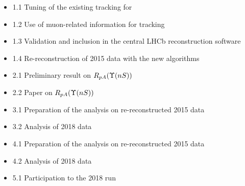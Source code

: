 \documentclass[a4paper,11pt]{article}
\begin{document}
\begin{itemize}
 \item 1.1 Tuning of the existing tracking for \pbpb
 \item 1.2 Use of muon-related information for \pbpb tracking
 \item 1.3 Validation and inclusion in the central LHCb reconstruction software
 \item 1.4 Re-reconstruction of 2015 data with the new algorithms
 \item 2.1 Preliminary result on $R_{pA} (\Upsilon(nS))$
 \item 2.2 Paper on $R_{pA} (\Upsilon(nS))$
 \item 3.1 Preparation of the \Dz analysis on re-reconstructed 2015 \pbpb data
 \item 3.2 Analysis of 2018 \pbpb data
 \item 4.1 Preparation of the \Jpsi analysis on re-reconstructed 2015 \pbpb data
 \item 4.2 Analysis of 2018 \pbpb data
 \item 5.1 Participation to the 2018 \pbpb run
\end{itemize}
\end{document}
